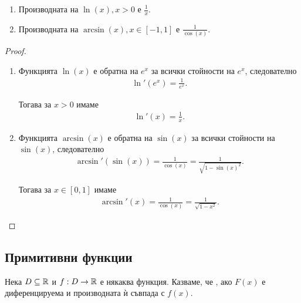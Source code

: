 \documentclass[numbers=endperiod, bibliography=totocnumbered]{scrartcl}
\begin{document}
\begin{theorem}
  \mbox{}
  \begin{enumerate}
    \item Производната на \( \ln(x), x > 0 \) е \( \frac 1 x \).
    \item Производната на \( \arcsin(x), x \in [-1, 1] \) е \( \frac 1 {\cos(x)} \).
  \end{enumerate}
\end{theorem}
\begin{proof}
  \mbox{}
  \begin{enumerate}
    \item Функцията \( \ln(x) \) е обратна на \( e^x \) за всички стойности на \( e^x \), следователно
    \begin{align*}
      \ln'(e^x) = \frac 1 {e^x}.
    \end{align*}

    Тогава за \( x > 0 \) имаме
    \begin{align*}
      \ln'(x) = \frac 1 {x}.
    \end{align*}

    \item Функцията \( \arcsin(x) \) е обратна на \( \sin(x) \) за всички стойности на \( \sin(x) \), следователно
    \begin{align*}
      \arcsin'(\sin(x)) = \frac 1 {\cos(x)} = \frac 1 {\sqrt{1 - {\sin(x)}^2}}.
    \end{align*}

    Тогава за \( x \in [0, 1] \) имаме
    \begin{align*}
      \arcsin'(x) = \frac 1 {\cos(x)} = \frac 1 {\sqrt{1 - x^2}}.
    \end{align*}
  \end{enumerate}
\end{proof}

\subsection{Примитивни функции}

\begin{definition}
  Нека \( D \subseteq \mathbb{R} \) и \( f: D \to \mathbb{R} \) е някаква функция. Казваме, че , ако \( F(x) \) е диференцируема и производната ѝ съвпада с \( f(x) \).
\end{definition}
\end{document}
